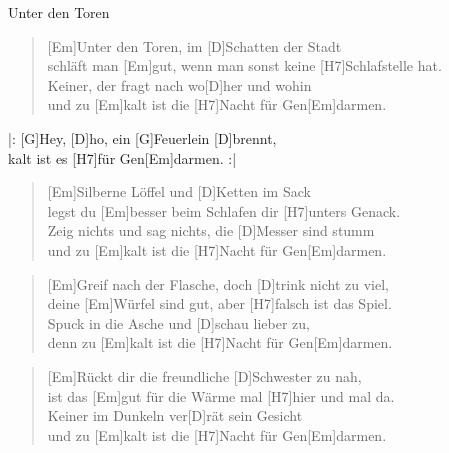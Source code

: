 \begin{song}{Unter den Toren}{}

    \begin{verse}  
        [Em]Unter den Toren, im [D]Schatten der Stadt \\
        schläft man [Em]gut, wenn man sonst keine [H7]Schlafstelle hat. \\
        [Em]Keiner, der fragt nach wo[D]her und wohin \\
        und zu [Em]kalt ist die [H7]Nacht für Gen[Em]darmen. \\
    \end{verse}  

    \begin{chorus}
        |: [G]Hey, [D]ho, ein [G]Feuerlein [D]brennt, \\
        [Em]kalt ist es [H7]für Gen[Em]darmen. :| 
    \end{chorus}

    \begin{verse}  
        [Em]Silberne Löffel und [D]Ketten im Sack \\ 
        legst du [Em]besser beim Schlafen dir [H7]unters Genack. \\
        [Em]Zeig nichts und sag nichts, die [D]Messer sind stumm \\
        und zu [Em]kalt ist die [H7]Nacht für Gen[Em]darmen. 
    \end{verse}  


    \begin{verse}  
        [Em]Greif nach der Flasche, doch [D]trink nicht zu viel, \\
        deine [Em]Würfel sind gut, aber [H7]falsch ist das Spiel. \\
        [Em]Spuck in die Asche und [D]schau lieber zu, \\
        denn zu [Em]kalt ist die [H7]Nacht für Gen[Em]darmen.
    \end{verse}  


    \begin{verse}  
        [Em]Rückt dir die freundliche [D]Schwester zu nah, \\
        ist das [Em]gut für die Wärme mal [H7]hier und mal da. \\
        [Em]Keiner im Dunkeln ver[D]rät sein Gesicht \\
        und zu [Em]kalt ist die [H7]Nacht für Gen[Em]darmen.
    \end{verse}  


\end{song}
